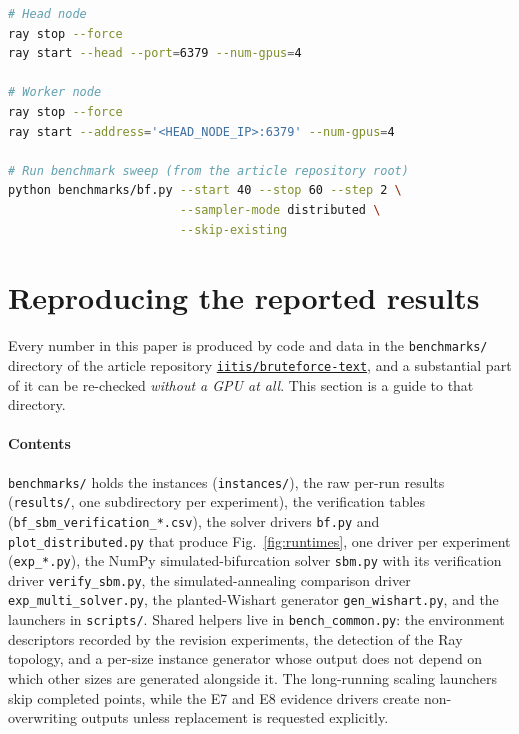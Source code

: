 \documentclass[12pt,a4paper]{elsarticle}
\newcommand{\datarepo}{https://github.com/iitis/bruteforce-text}
\newcommand{\datareponame}{\texttt{iitis/bruteforce-text}}
\begin{document}
\begin{lstlisting}[language=bash,caption={Ray startup and benchmark command used to produce Fig.~\ref{fig:runtimes}},label={lst:ray-commands}]
# Head node
ray stop --force
ray start --head --port=6379 --num-gpus=4

# Worker node
ray stop --force
ray start --address='<HEAD_NODE_IP>:6379' --num-gpus=4

# Run benchmark sweep (from the article repository root)
python benchmarks/bf.py --start 40 --stop 60 --step 2 \
                        --sampler-mode distributed \
                        --skip-existing
\end{lstlisting}

\section{Reproducing the reported results}
\label{sec:reproduction}
Every number in this paper is produced by code and data in the
\texttt{benchmarks/} directory of the article repository
\href{\datarepo}{\datareponame}, and a substantial part of it can be re-checked
\emph{without a GPU at all}. This section is a guide to that directory.

\paragraph{Contents}
\texttt{benchmarks/} holds the instances (\texttt{instances/}), the raw
per-run results (\texttt{results/}, one subdirectory per experiment), the
verification tables (\texttt{bf\_sbm\_verification\_*.csv}), the solver
drivers \texttt{bf.py} and \texttt{plot\_distributed.py} that produce
Fig.~\ref{fig:runtimes}, one driver per experiment
(\texttt{exp\_*.py}), the NumPy simulated-bifurcation solver \texttt{sbm.py}
with its verification driver \texttt{verify\_sbm.py}, the simulated-annealing
comparison driver \texttt{exp\_multi\_solver.py}, the planted-Wishart generator
\texttt{gen\_wishart.py}, and the launchers in
\texttt{scripts/}. Shared helpers live in \texttt{bench\_common.py}: the
environment descriptors recorded by the revision experiments, the detection of the Ray
topology, and a per-size instance generator whose output does not depend on
which other sizes are generated alongside it. The long-running scaling launchers
skip completed points, while the E7 and E8 evidence drivers create non-overwriting
outputs unless replacement is requested explicitly.
\end{document}
